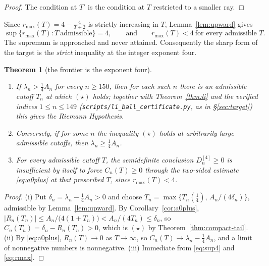 \documentclass[11pt]{amsart}
\newtheorem{theorem}{Theorem}[section]
\theoremstyle{definition}
\theoremstyle{remark}
\theoremstyle{definition}
\begin{document}
\begin{proof}
The condition at $T'$ is the condition at $T$ restricted to a smaller ray.
\end{proof}

Since $r_{\max}(T)=4-\tfrac{4}{T+2}$ is strictly increasing in $T$, Lemma~\ref{lem:upward} gives
\begin{equation}\label{eq:sup4}
   \sup\bigl\{r_{\max}(T):T\ \text{admissible}\bigr\}=4,
   \qquad\text{and}\qquad r_{\max}(T)<4\ \text{for every admissible }T .
\end{equation}
The supremum is approached and never attained. Consequently the sharp form of the target is the
\emph{strict} inequality at the integer exponent four.

\begin{theorem}[the frontier is the exponent four]\label{thm:four}
\begin{enumerate}[label=\textup{(\roman*)},leftmargin=*]
\item If $\lambda_n>\tfrac14A_n$ for every $n\ge150$, then for each such $n$ there is an
admissible cutoff $T_n$ at which $(\star)$ holds; together with Theorem~\ref{thm:li} and the
verified indices $1\le n\le149$ (\texttt{scripts/li\_ball\_certificate.py}, as in \S\ref{sec:target}) this
gives the Riemann Hypothesis.
\item Conversely, if for some $n$ the inequality $(\star)$ holds at arbitrarily large admissible
cutoffs, then $\lambda_n\ge\tfrac14A_n$.
\item For every admissible cutoff $T$, the semidefinite conclusion $D_n^{[4]}\ge0$ is
insufficient \emph{by itself to force $C_n(T)\ge0$ through the two-sided estimate
\eqref{eq:a0plus} at that prescribed $T$}, since $r_{\max}(T)<4$.
\end{enumerate}
\end{theorem}

\begin{proof}
(i) Put $\delta_n=\lambda_n-\tfrac14A_n>0$ and choose
$T_n=\max\bigl\{T_n(\tfrac14),\,A_n/(4\delta_n)\bigr\}$, admissible by Lemma~\ref{lem:upward}.
By Corollary~\ref{cor:a0plus},
$|R_n(T_n)|\le A_n/\bigl(4(1+T_n)\bigr)<A_n/(4T_n)\le\delta_n$, so
$C_n(T_n)=\delta_n-R_n(T_n)>0$, which is $(\star)$ by Theorem~\ref{thm:compact-tail}.
(ii) By \eqref{eq:a0plus}, $R_n(T)\to0$ as $T\to\infty$, so
$C_n(T)\to\lambda_n-\tfrac14A_n$, and a limit of nonnegative numbers is nonnegative.
(iii) Immediate from \eqref{eq:sup4} and \eqref{eq:rmax}.
\end{proof}
\end{document}
